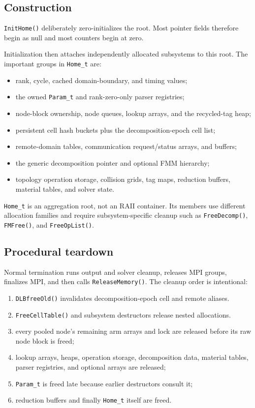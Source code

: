 \documentclass[11pt]{article}
\newcommand{\code}[1]{\texorpdfstring{\nolinkurl{#1}}{#1}}
\begin{document}
\subsection{Construction}

\code{InitHome()} deliberately zero-initializes the root.  Most pointer fields
therefore begin as null and most counters begin at zero.



Initialization then attaches independently allocated subsystems to this
root.  The important groups in \code{Home_t} are:

\begin{itemize}
\item rank, cycle, cached domain-boundary, and timing values;
\item the owned \code{Param_t} and rank-zero-only parser registries;
\item node-block ownership, node queues, lookup arrays, and the recycled-tag
heap;
\item persistent cell hash buckets plus the decomposition-epoch cell list;
\item remote-domain tables, communication request/status arrays, and buffers;
\item the generic decomposition pointer and optional FMM hierarchy;
\item topology operation storage, collision grids, tag maps, reduction
buffers, material tables, and solver state.
\end{itemize}

\code{Home_t} is an aggregation root, not an RAII container.  Its members use
different allocation families and require subsystem-specific cleanup such as
\code{FreeDecomp()}, \code{FMFree()}, and \code{FreeOpList()}.

\subsection{Procedural teardown}

Normal termination runs output and solver cleanup, releases MPI groups,
finalizes MPI, and then calls \code{ReleaseMemory()}.  The cleanup order is
intentional:

\begin{enumerate}
\item \code{DLBfreeOld()} invalidates decomposition-epoch cell and remote
aliases.
\item \code{FreeCellTable()} and subsystem destructors release nested
allocations.
\item every pooled node's remaining arm arrays and lock are released before
its raw node block is freed;
\item lookup arrays, heaps, operation storage, decomposition data, material
tables, parser registries, and optional arrays are released;
\item \code{Param_t} is freed late because earlier destructors consult it;
\item reduction buffers and finally \code{Home_t} itself are freed.
\end{enumerate}
\end{document}
